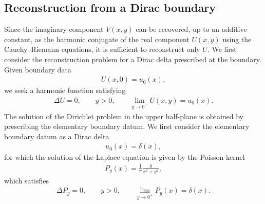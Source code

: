 \documentclass[11pt]{article}
\begin{document}
	\subsection{Reconstruction from a Dirac boundary}
	
    Since the imaginary component $V(x,y)$ can be recovered, up to an additive constant, as the harmonic conjugate of the real component $U(x,y)$ using the Cauchy--Riemann equations, it is sufficient to reconstruct only $U$. We first consider the reconstruction problem for a Dirac delta prescribed at the boundary. Given boundary data
	\begin{align*}
		U(x,0)=u_0(x) ,
	\end{align*}
	we seek a harmonic function satisfying
	\begin{align*}
		\Delta U=0,\qquad y>0,\qquad \lim_{y\to0^+}U(x,y)=u_0(x).
	\end{align*}
	The solution of the Dirichlet problem in the upper half-plane is obtained by prescribing the elementary boundary datum. We first consider the elementary boundary datum as a Dirac delta
	\begin{align*}
		u_0(x)=\delta(x),
	\end{align*}
	for which the solution of the Laplace equation is given by the Poisson kernel
	\begin{align}
		P_y(x)=\frac{1}{\pi}\frac{y}{x^2+y^2},
		\label{eq.Poisson_kernel}
	\end{align}
	which satisfies
	\begin{align*}
		\Delta P_y=0,\qquad y>0,\qquad \lim_{y\to0^+}P_y(x)=\delta(x).
	\end{align*}
	
\end{document}
